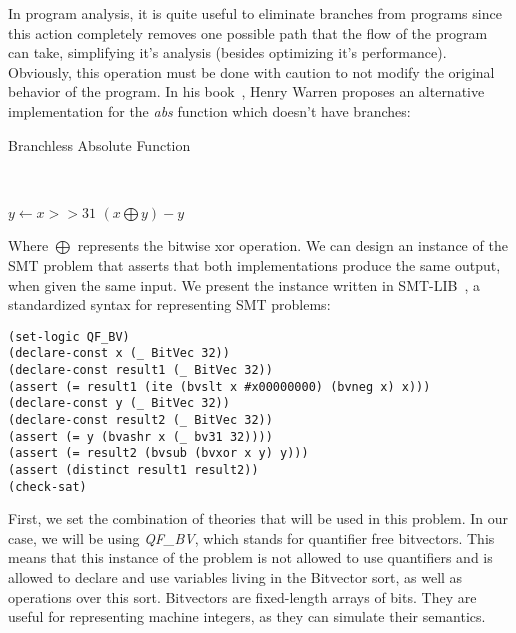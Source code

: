 In program analysis, it is quite useful to eliminate branches from programs since this action completely removes one possible path that the flow of the program can take, simplifying it's analysis (besides optimizing it's performance). Obviously, this operation must be done with caution to not modify the original behavior of the program. In his book~\cite{hacker_delight}, Henry Warren proposes an alternative implementation for the \textit{abs} function which doesn't have branches:

\begin{algorithm}[H]
\caption{Branchless Absolute Function}~\label{branchlessAbs}
\begin{algorithmic}[1]
  \State $y \gets x >> 31$
  \State \Return $(x \bigoplus y) - y$
\EndFunction
\end{algorithmic}
\end{algorithm}

Where $\bigoplus$ represents the bitwise xor operation. We can design an instance of the SMT problem that asserts that both implementations produce the same output, when given the same input. We present the instance written in SMT-LIB~\cite{smtlib}, a standardized syntax for representing SMT problems:

\begin{verbatim}
(set-logic QF_BV)
(declare-const x (_ BitVec 32))
(declare-const result1 (_ BitVec 32))
(assert (= result1 (ite (bvslt x #x00000000) (bvneg x) x)))
(declare-const y (_ BitVec 32))
(declare-const result2 (_ BitVec 32))
(assert (= y (bvashr x (_ bv31 32))))
(assert (= result2 (bvsub (bvxor x y) y)))
(assert (distinct result1 result2))
(check-sat)
\end{verbatim}

First, we set the combination of theories that will be used in this problem. In our case, we will be using \textit{QF\_BV}, which stands for quantifier free bitvectors. This means that this instance of the problem is not allowed to use quantifiers and is allowed to declare and use variables living in the Bitvector sort, as well as operations over this sort. Bitvectors are fixed-length arrays of bits. They are useful for representing machine integers, as they can simulate their semantics.

